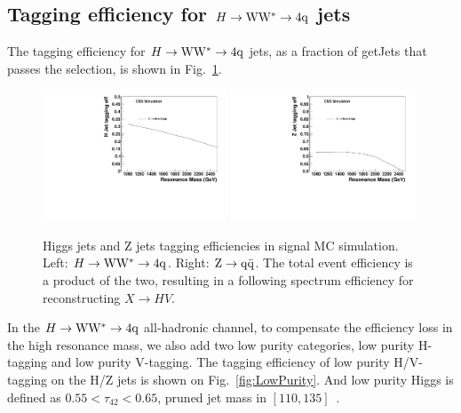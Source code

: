 

\clearpage





\subsection{Tagging efficiency for $H\to{\rm W}{\rm W}^*\to4{\rm q}$ jets}


The tagging efficiency for $H\to{\rm W}{\rm W}^*\to4{\rm q}$ jets, as a fraction of getJets that
passes the selection, is shown in Fig.~\ref{fig:HwwEff}.
\begin{figure}[htb]
\begin{center}
\includegraphics[width=0.49\textwidth]{EXO-14-009/HqqqqZqqfigs/Signal/H-taggingEff-8TeV.pdf}
\includegraphics[width=0.49\textwidth]{EXO-14-009/HqqqqZqqfigs/Signal/Z-taggingEff-8TeV.pdf}
\end{center}
\caption{
  Higgs jets and Z jets tagging efficiencies in signal MC simulation.
  Left: $H\to{\rm W}{\rm W}^*\to4{\rm q}$. Right: ${\rm Z}\to{\rm q\bar{q}}$.  The total event efficiency is a product
  of the two, resulting in a following spectrum efficiency for reconstructing
  $X \to HV$.
}
\label{fig:HwwEff}
\end{figure}
 

In the $H\to{\rm W}{\rm W}^*\to4{\rm q}$ all-hadronic channel, to compensate the efficiency loss
in the high resonance mass, we also add two low purity categories, low
purity H-tagging and low purity V-tagging.  The tagging efficiency of
low purity H/V-tagging on the H/Z jets is shown on
Fig.~\ref{fig:LowPurity}.  And low purity Higgs is defined as 
$0.55 < \tau_{42} < 0.65$, pruned jet mass in $[110, 135]$~\GeVcc.  

